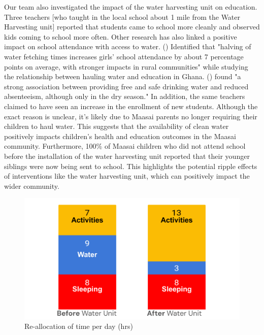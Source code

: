 \documentclass[10pt, twocolumn]{article}
\begin{document}
Our team also investigated the impact of the water harvesting unit on education. Three teachers [who taught in the local school about 1 mile from the Water Harvesting unit] reported that students came to school more cleanly and observed kids coming to school more often. Other research has also linked a positive impact on school attendance with access to water. (\autocite{Nauges2017}) Identified that "halving of water fetching times increases girls’ school attendance by about 7 percentage points on average, with stronger impacts in rural communities" while studying the relationship between hauling water and education in Ghana. (\autocite{Cambodia_Water_Education}) found "a strong association between providing free and safe drinking water and reduced absenteeism, although only in the dry season." In addition, the same teachers claimed to have seen an increase in the enrollment of new students. Although the exact reason is unclear, it's likely due to Maasai parents no longer requiring their children to haul water. This suggests that the availability of clean water positively impacts children's health and education outcomes in the Maasai community. Furthermore, 100\% of Maasai children who did not attend school before the installation of the water harvesting unit reported that their younger siblings were now being sent to school. This highlights the potential ripple effects of interventions like the water harvesting unit, which can positively impact the wider community. 

\begin{figure}
    \centering
    \includegraphics[width=1\linewidth]{photos/time_reallocation.png}
    \caption{Re-allocation of time per day (hrs)}
    \label{fig:reallocation}
\end{figure}
\end{document}
